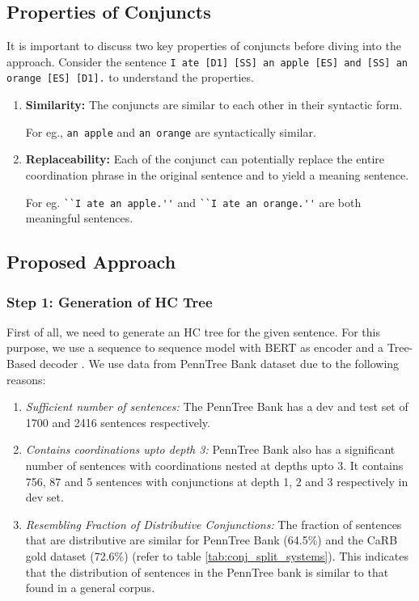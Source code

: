     \subsection{Properties of Conjuncts}
        It is important to discuss two key properties of conjuncts before diving into the approach. Consider the sentence \verb|I ate [D1] [SS] an apple [ES] and [SS] an orange [ES] [D1].| to understand the properties.
        \begin{enumerate}
            \item \textbf{Similarity:} The conjuncts are similar to each other in their syntactic form.
            
            For eg., \verb|an apple| and \verb|an orange| are syntactically similar.

            \item \textbf{Replaceability:} Each of the conjunct can potentially replace the entire coordination phrase in the original sentence and to yield a meaning sentence.
            
            For eg. \verb|``I ate an apple.''| and \verb|``I ate an orange.''| are both meaningful sentences.
            
        \end{enumerate}

    \subsection{Proposed Approach}

        \subsubsection{Step 1: Generation of HC Tree}
        
            First of all, we need to generate an HC tree for the given sentence. For this purpose, we use a sequence to sequence model with BERT as encoder and a Tree-Based decoder \citep{wang&al18}. We use data from PennTree Bank \citep{PennTreeBank} dataset due to the following reasons:
            \begin{enumerate}
                \item \textit{Sufficient number of sentences:} The PennTree Bank has a dev and test set of 1700 and 2416 sentences respectively.
                \item \textit{Contains coordinations upto depth 3:} PennTree Bank also has a significant number of sentences with coordinations nested at depths upto 3. It contains 756, 87 and 5 sentences with conjunctions at depth 1, 2 and 3 respectively in dev set.
                \item \textit{Resembling Fraction of Distributive Conjunctions:} The fraction of sentences that are distributive are similar for PennTree Bank (64.5\%) and the CaRB gold dataset (72.6\%) (refer to table \ref{tab:conj_split_systems}). This indicates that the distribution of sentences in the PennTree bank is similar to that found in a general corpus.
            \end{enumerate}

